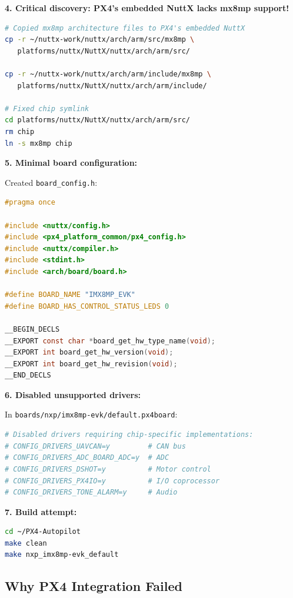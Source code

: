 \documentclass[12pt,a4paper]{report}
\begin{document}
\textbf{4. Critical discovery: PX4's embedded NuttX lacks mx8mp support!}

\begin{lstlisting}[language=bash]
# Copied mx8mp architecture files to PX4's embedded NuttX
cp -r ~/nuttx-work/nuttx/arch/arm/src/mx8mp \
   platforms/nuttx/NuttX/nuttx/arch/arm/src/

cp -r ~/nuttx-work/nuttx/arch/arm/include/mx8mp \
   platforms/nuttx/NuttX/nuttx/arch/arm/include/

# Fixed chip symlink
cd platforms/nuttx/NuttX/nuttx/arch/arm/src/
rm chip
ln -s mx8mp chip
\end{lstlisting}

\textbf{5. Minimal board configuration:}

Created \texttt{board\_config.h}:

\begin{lstlisting}[language=c]
#pragma once

#include <nuttx/config.h>
#include <px4_platform_common/px4_config.h>
#include <nuttx/compiler.h>
#include <stdint.h>
#include <arch/board/board.h>

#define BOARD_NAME "IMX8MP_EVK"
#define BOARD_HAS_CONTROL_STATUS_LEDS 0

__BEGIN_DECLS
__EXPORT const char *board_get_hw_type_name(void);
__EXPORT int board_get_hw_version(void);
__EXPORT int board_get_hw_revision(void);
__END_DECLS
\end{lstlisting}

\textbf{6. Disabled unsupported drivers:}

In \texttt{boards/nxp/imx8mp-evk/default.px4board}:

\begin{lstlisting}[language=python]
# Disabled drivers requiring chip-specific implementations:
# CONFIG_DRIVERS_UAVCAN=y         # CAN bus
# CONFIG_DRIVERS_ADC_BOARD_ADC=y  # ADC
# CONFIG_DRIVERS_DSHOT=y          # Motor control
# CONFIG_DRIVERS_PX4IO=y          # I/O coprocessor
# CONFIG_DRIVERS_TONE_ALARM=y     # Audio
\end{lstlisting}

\textbf{7. Build attempt:}

\begin{lstlisting}[language=bash]
cd ~/PX4-Autopilot
make clean
make nxp_imx8mp-evk_default
\end{lstlisting}

\subsection{Why PX4 Integration Failed}
\end{document}
